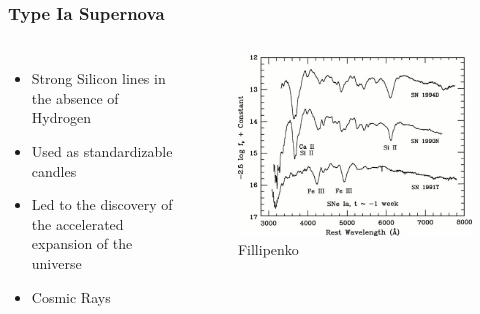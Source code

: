 \documentclass{beamer}
\begin{document}

\begin{frame}
\frametitle{Type Ia Supernova}

\begin{columns}[c]
	\begin{itemize}
		\item Strong Silicon lines in the absence of Hydrogen
		\item Used as standardizable candles
		\item Led to the discovery of the accelerated expansion of the universe
		\item Cosmic Rays
	\end{itemize}


        \begin{figure}
    \begin{center}
      \includegraphics[width=.90\linewidth]{spectrum.jpg}
	    \caption{Fillipenko}
    \end{center}
  \end{figure}

        \end{columns}

\end{frame}

\end{document}
